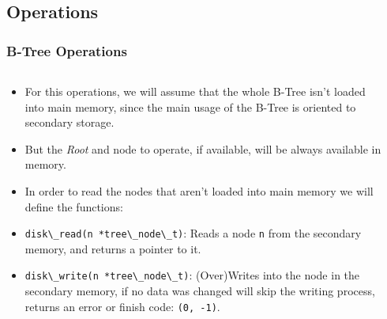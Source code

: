 \documentclass{beamer}
\begin{document}
\begin{frame}
    \subsection{Operations}
    \frametitle{B-Tree Operations}
    \begin{columns}
        \begin{column}{\textlecolumn}
            \begin{block}{}
                \begin{itemize}
                    \item For this operations, we will assume that the whole B-Tree isn't loaded into main memory, since the main usage of the B-Tree is oriented to secondary storage. 
                    \item But the \emph{Root} and node to operate, if available, will be always available in memory.
                    \item In order to read the nodes that aren't loaded into main memory we will define the functions:
                    \item \lstinline|disk\_read(n *tree\_node\_t)|: Reads a node \lstinline|n| from the secondary memory, and returns a pointer to it.
                    \item \lstinline|disk\_write(n *tree\_node\_t)|: (Over)Writes into the node in the secondary memory, if no data was changed will skip the writing process, returns an error or finish code: \lstinline|(0, -1)|.
                \end{itemize}
            \end{block}
        \end{column}
        \begin{column}{\textricolumn}
        \end{column}
    \end{columns}
\end{frame}
\end{document}
